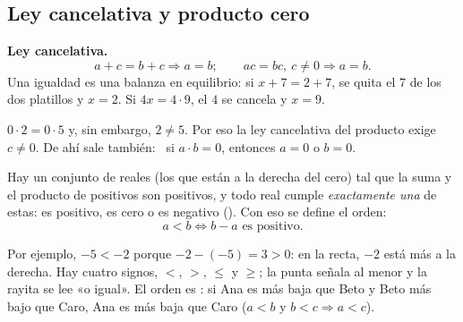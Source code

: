 \documentclass[11pt,a4paper]{article}
\let\nivelzuka\nivel
\renewcommand{\nivel}[2]{\Needspace{5\baselineskip}\nivelzuka{#1}{#2}}
\begin{document}
\subsection{Ley cancelativa y producto cero}
\begin{minipage}[c]{0.58\linewidth}
\textbf{\color{zaccent}Ley cancelativa.}
\[ a+c=b+c\Rightarrow a=b;\qquad ac=bc,\ c\neq0\Rightarrow a=b. \]
Una igualdad es una balanza en equilibrio: si $x+7=2+7$, se quita el $7$ de los dos platillos y $x=2$. Si
$4x=4\cdot9$, el $4$ se cancela y $x=9$.
\end{minipage}\hfill
\begin{minipage}[c]{0.38\linewidth}\centering
{}
\end{minipage}
\begin{ojo}
$0\cdot2=0\cdot5$ y, sin embargo, $2\neq5$. Por eso la ley cancelativa del producto exige $c\neq0$.
De ahí sale también: \ si $a\cdot b=0$, entonces $a=0$ o $b=0$.
\end{ojo}


\begin{definicion}
Hay un conjunto de reales  (los que están a la derecha del cero) tal que la suma y el producto de
positivos son positivos, y todo real cumple \emph{exactamente una} de estas: es positivo, es cero o es negativo
(). Con eso se define el orden:
\[ a<b\iff b-a \text{ es positivo}. \]
\end{definicion}
Por ejemplo, $-5<-2$ porque $-2-(-5)=3>0$: en la recta, $-2$ está más a la derecha. Hay cuatro signos, $<$, $>$, $\le$ y
$\ge$; la punta señala al menor y la rayita se lee «o igual». El orden es : si Ana es más baja que Beto
y Beto más bajo que Caro, Ana es más baja que Caro ($a<b$ y $b<c\Rightarrow a<c$).
\end{document}
